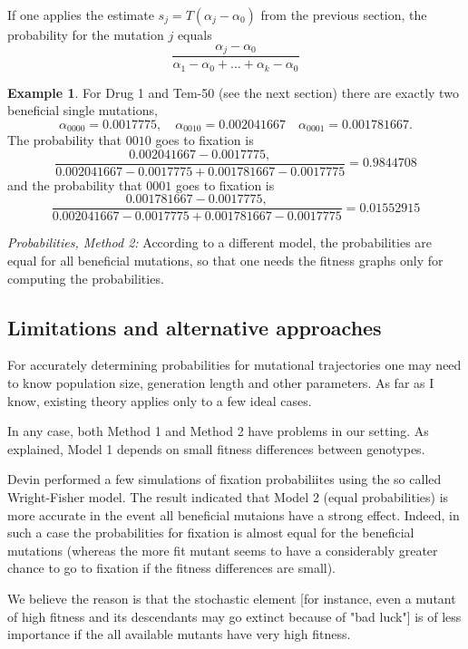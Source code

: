 \documentclass[12pt]{amsart}
\theoremstyle{plain}
\theoremstyle{definition}
\newtheorem{example}[theorem]{Example}
\begin{document}
{If one applies the estimate
$s_j=T(\alpha_j-\alpha_0)$
 from the previous section,
the probability for the mutation $j$ 
equals
\[
\frac{\alpha_j-\alpha_0}
{\alpha_1-\alpha_0+ \dots + \alpha_k-\alpha_0}
\]


\begin{example}
For Drug 1 and Tem-50 (see the next section)
there are exactly two beneficial single mutations,
\[
\alpha_{0000}=0.0017775, \quad
\alpha_{0010}=  0.002041667 \quad
\alpha_{0001}= 0.001781667.
\]
The probability that 
$0010$ goes to fixation is
\[
\frac{0.002041667- 0.0017775,}
{ 0.002041667-0.0017775 +  0.001781667-0.0017775}=
0.9844708
\]
and the probability that $0001$ goes to fixation is
\[
\frac{0.001781667-0.0017775,}
{ 0.002041667-0.0017775 +  0.001781667-0.0017775}=
0.01552915
\]
\end{example}



{\emph{Probabilities, Method 2:}}
According to a different model,
the probabilities are equal for 
all beneficial mutations, so that
one needs the fitness graphs
only for computing the probabilities.




\subsection{Limitations and alternative approaches}
For accurately determining probabilities
for mutational trajectories one may need
to know population size, generation length
and other parameters. As far as I know,
existing theory applies only to a few ideal 
cases.


In any case, both Method 1 and Method 2 have
problems in our setting. 
As explained, Model 1 depends
on small fitness differences between
genotypes.


Devin performed a few simulations 
of fixation probabiliites 
using the so called Wright-Fisher
model. The result indicated that
Model 2 (equal probabilities) is more accurate
in the event all beneficial mutaions
have a strong effect.
Indeed, in such a  case the probabilities
for fixation is almost equal for
the beneficial mutations
(whereas
the more fit mutant seems
to have a considerably 
greater chance to go to
fixation if the fitness differences
are small).

We believe the reason is that
the stochastic element 
[for instance, even a mutant of high fitness
and its descendants
may go extinct because of "bad luck"] 
is of less importance if the
all available  mutants 
have very high fitness.

}
\end{document}
